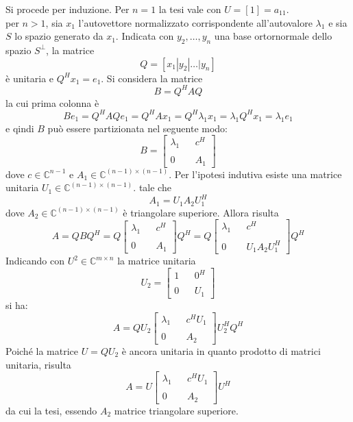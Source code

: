 \begin{thproof}
Si procede per induzione. Per $n=1$ la tesi vale con $U = [1]= a_{11}$. \\
 per $n>1$, sia $x_1$ l'autovettore normalizzato
corrispondente all'autovalore $\lambda_1$ e sia $S$ lo spazio
generato da $x_1$. Indicata con $y_2, \ldots, y_n$ una base
ortornormale dello spazio $S^{\bot}$, la matrice
$$ Q = [ x_1 | y_2 | \ldots | y_n ] $$
\`e unitaria e $Q^{H}x_1 = e_1$. Si considera la matrice
$$ B = Q^{H}AQ$$
la cui prima colonna \`e
$$ Be_1 = Q^{H}AQe_1 = Q^{H}Ax_1 = Q^{H}\lambda_1 x_1 = 
\lambda_1 Q^{H}x_1 = \lambda_1 e_1$$
e qindi $B$ può essere partizionata nel seguente modo:
$$
B =
\left[
\begin{array}{ccc}
\lambda_1 & & c^{H}  \\
& & \\
0 & & A_1 
\end{array}
\right]
$$
dove $c \in \mathbb{C}^{n-1}$ e $A_1 \in \mathbb{C}^{(n-1)\times (n-1)}$.
Per l'ipotesi indutiva esiste una
 matrice unitaria $U_1 \in \mathbb{C}^{(n-1)\times (n-1)}$. tale che
$$ A_1 = U_1 A_2 U_1^{H} $$
dove $A_2 \in \mathbb{C}^{(n-1)\times (n-1)}$ \`e triangolare superiore.
Allora risulta
$$ A = QBQ^{H} = Q
\left[
\begin{array}{ccc}
\lambda_1 & & c^{H}  \\
& & \\
0 & & A_1 
\end{array}
\right]
Q^{H} =
 Q 
\left[
\begin{array}{ccc}
\lambda_1 & & c^{H}  \\
& & \\
0 & & U_1A_2U_1^{H} 
\end{array}
\right]
Q^{H}
$$
Indicando con $U^{2} \in \mathbb{C}^{m \times n}$ la matrice unitaria
$$ U_2 =
\left[
\begin{array}{ccc}
1 & & 0^{H}  \\
& & \\
0 & & U_1 
\end{array}
\right]
$$
si ha:
$$ A = QU_2
\left[
\begin{array}{ccc}
\lambda_1 & & c^{H}U_1  \\
& & \\
0 & & A_2 
\end{array}
\right]
U_2^{H}Q^{H}
$$
Poich\'e la matrice $U=QU_2$ \`e ancora unitaria in quanto 
prodotto di matrici unitaria, risulta
$$ A = U
\left[
\begin{array}{ccc}
\lambda_1 & & c^{H}U_1  \\
& & \\
0 & & A_2 
\end{array}
\right]
U^{H}
$$
da cui la tesi, essendo $A_2$ matrice triangolare superiore.
\end{thproof}


